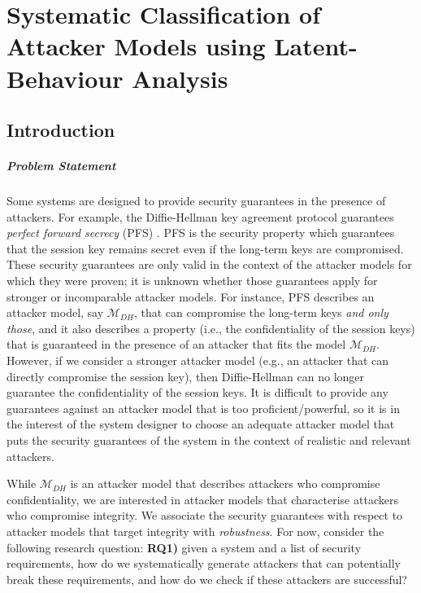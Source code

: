 \chapter{Systematic Classification of Attacker Models using Latent-Behaviour Analysis}
\label{ch:Classification}
\section{Introduction}
\label{sec:Classification:ClassificationProblem}
\paragraph{Problem Statement}
Some systems are designed to provide security guarantees in the presence of attackers. For example, the Diffie-Hellman key agreement protocol guarantees \emph{perfect forward secrecy} (PFS) \cite{Gunther1990,Menezes1996}. PFS is the security property which guarantees that the session key remains secret even if the long-term keys are compromised. These security guarantees are only valid in the context of the attacker models for which they were proven; it is unknown whether those guarantees apply for stronger or incomparable attacker models. For instance, PFS describes an attacker model, say $\mathcal{M}_{DH}$, that can compromise the long-term keys \emph{and only those}, and it also describes a property (i.e., the confidentiality of the session keys) that is guaranteed in the presence of an attacker that fits the model $\mathcal{M}_{DH}$. However, if we consider a stronger attacker model (e.g., an attacker that can directly compromise the session key), then Diffie-Hellman can no longer guarantee the confidentiality of the session keys. It is difficult to provide any guarantees against an attacker model that is too proficient/powerful, so it is in the interest of the system designer to choose an adequate attacker model that puts the security guarantees of the system in the context of realistic and relevant attackers. 
 
While $\mathcal{M}_{DH}$ is an attacker model that describes attackers who compromise confidentiality, we are interested in attacker models that characterise attackers who compromise integrity. We associate the security guarantees with respect to attacker models that target integrity with \emph{robustness}. For now, consider the following research question: \textbf{RQ1)} given a system and a list of security requirements, how do we systematically generate attackers that can potentially break these requirements, and how do we check if these attackers are successful? 

